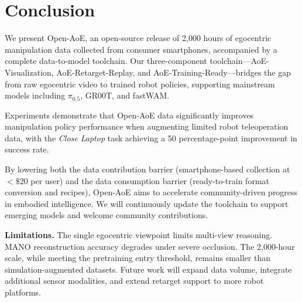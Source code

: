 \section{Conclusion}

We present Open-AoE, an open-source release of 2,000 hours of egocentric manipulation data collected from consumer smartphones, accompanied by a complete data-to-model toolchain. Our three-component toolchain---AoE-Visualization, AoE-Retarget-Replay, and AoE-Training-Ready---bridges the gap from raw egocentric video to trained robot policies, supporting mainstream models including $\pi_{0.5}$, GR00T, and fastWAM.

Experiments demonstrate that Open-AoE data significantly improves manipulation policy performance when augmenting limited robot teleoperation data, with the \textit{Close Laptop} task achieving a 50 percentage-point improvement in success rate.

By lowering both the data contribution barrier (smartphone-based collection at $<\$20$ per user) and the data consumption barrier (ready-to-train format conversion and recipes), Open-AoE aims to accelerate community-driven progress in embodied intelligence. We will continuously update the toolchain to support emerging models and welcome community contributions.

\textbf{Limitations.} The single egocentric viewpoint limits multi-view reasoning. MANO reconstruction accuracy degrades under severe occlusion. The 2,000-hour scale, while meeting the pretraining entry threshold, remains smaller than simulation-augmented datasets. Future work will expand data volume, integrate additional sensor modalities, and extend retarget support to more robot platforms.
